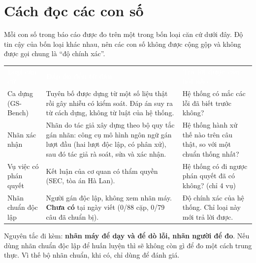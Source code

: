 \documentclass[12pt,a4paper,oneside]{report}
\newcommand{\thd}[1]{\textcolor{white}{\bfseries #1}}
\newcommand{\hdr}{\rowcolor{gsteal}}
\newcommand{\bangchu}{\small\linespread{1.08}\selectfont}
\renewcommand{\cftchappresnum}{Chương }
\begin{document}
\section*{Cách đọc các con số}
Mỗi con số trong báo cáo được đo trên một trong bốn loại căn cứ dưới đây. Độ tin cậy của bốn loại khác nhau, nên các con số không được cộng gộp và không được gọi chung là “độ chính xác”.

{\bangchu
{}
\noindent\begin{tabularx}{\linewidth}{L{3.6cm}YL{4.2cm}}
\hdr\thd{Loại căn cứ} & \thd{Đáp án đến từ đâu} & \thd{Trả lời được câu hỏi nào}\\
Ca dựng (GS-Bench) & Tuyên bố được dựng từ một số liệu thật rồi gây nhiễu có kiểm soát. Đáp án suy ra từ cách dựng, không từ luật của hệ thống. & Hệ thống có mắc các lỗi đã biết trước không?\\
Nhãn xác nhận & Nhãn do tác giả xây dựng theo bộ quy tắc gán nhãn: công cụ mô hình ngôn ngữ gán lượt đầu (hai lượt độc lập, có phân xử), sau đó tác giả rà soát, sửa và xác nhận. & Hệ thống hành xử thế nào trên câu thật, so với một chuẩn thống nhất?\\
Vụ việc có phán quyết & Kết luận của cơ quan có thẩm quyền (SEC, tòa án Hà Lan). & Hệ thống có đi ngược phán quyết đã có không? (chỉ 4 vụ)\\
Nhãn chuẩn độc lập & Người gán độc lập, không xem nhãn máy. \textbf{Chưa có} tại ngày viết (0/88 cặp, 0/79 câu đã chuẩn bị). & Độ chính xác của hệ thống. Chỉ loại này mới trả lời được.\\
\end{tabularx}}

\medskip
Nguyên tắc đi kèm: \textbf{nhãn máy để dạy và để dò lỗi, nhãn người để đo}. Nếu dùng nhãn chuẩn độc lập để huấn luyện thì sẽ không còn gì để đo một cách trung thực. Vì thế bộ nhãn chuẩn, khi có, chỉ dùng để đánh giá.

\cleardoublepage
{}












\appendix
\addtocontents{toc}{\protect\renewcommand{\protect\cftchappresnum}{Phụ lục }}

\end{document}
